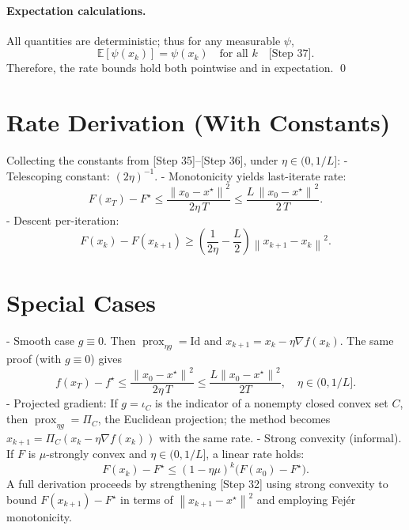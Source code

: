 \documentclass[11pt]{article}
\newcommand{\prox}{\operatorname{prox}}
\newcommand{\norm}[1]{\left\lVert #1 \right\rVert}
\begin{document}
\paragraph{Expectation calculations.}
All quantities are deterministic; thus for any measurable $\psi$,
\[
\mathbb{E}[\psi(x_k)] = \psi(x_k) \quad\text{for all }k \quad\text{[Step 37]}.
\]
Therefore, the rate bounds hold both pointwise and in expectation.
\qed

\section*{Rate Derivation (With Constants)}
Collecting the constants from [Step 35]--[Step 36], under $\eta\in(0,1/L]$:
- Telescoping constant: $(2\eta)^{-1}$.
- Monotonicity yields last-iterate rate:
\[
F(x_T)-F^\star \le \frac{\norm{x_0-x^\star}^2}{2\eta\,T} \le \frac{L\,\norm{x_0-x^\star}^2}{2\,T}.
\]
- Descent per-iteration:
\[
F(x_k)-F(x_{k+1}) \ge \left(\frac{1}{2\eta}-\frac{L}{2}\right)\norm{x_{k+1}-x_k}^2.
\]

\section*{Special Cases}
- Smooth case $g\equiv 0$. Then $\prox_{\eta g}=\mathrm{Id}$ and $x_{k+1}=x_k-\eta\nabla f(x_k)$. The same proof (with $g\equiv 0$) gives
\[
f(x_T)-f^\star \le \frac{\norm{x_0-x^\star}^2}{2\eta\,T} \le \frac{L\norm{x_0-x^\star}^2}{2T},\quad \eta\in(0,1/L].
\]
- Projected gradient: If $g=\iota_C$ is the indicator of a nonempty closed convex set $C$, then $\prox_{\eta g}=\Pi_C$, the Euclidean projection; the method becomes $x_{k+1}=\Pi_C(x_k-\eta\nabla f(x_k))$ with the same rate.
- Strong convexity (informal). If $F$ is $\mu$-strongly convex and $\eta\in(0,1/L]$, a linear rate holds:
\[
F(x_k)-F^\star \le \left(1-\eta\mu\right)^k\bigl(F(x_0)-F^\star\bigr).
\]
A full derivation proceeds by strengthening [Step 32] using strong convexity to bound $F(x_{k+1})-F^\star$ in terms of $\norm{x_{k+1}-x^\star}^2$ and employing Fej\'er monotonicity.
\end{document}
